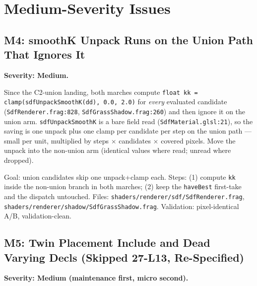 \documentclass[11pt,a4paper]{article}
\begin{document}
\section{Medium-Severity Issues}

\subsection{M4: smoothK Unpack Runs on the Union Path That Ignores It}

\textbf{Severity: Medium.}

Since the C2-union landing, both marches compute
\texttt{float kk = clamp(sdfUnpackSmoothK(dd), 0.0, 2.0)} for \emph{every}
evaluated candidate (\texttt{SdfRenderer.frag:828},
\texttt{SdfGrassShadow.frag:260}) and then ignore it on the union arm.
\texttt{sdfUnpackSmoothK} is a bare field read
(\texttt{SdfMaterial.glsl:21}), so the saving is one unpack plus one clamp
per candidate per step on the union path --- small per unit, multiplied by
steps $\times$ candidates $\times$ covered pixels. Move the unpack into the
non-union arm (identical values where read; unread where dropped).

\begin{tcolorbox}[promptbox={Prompt --- M4: unpack smoothK only off the union path}]
Goal: union candidates skip one unpack+clamp each. Steps: (1) compute
\texttt{kk} inside the non-union branch in both marches; (2) keep the
\texttt{haveBest} first-take and the dispatch untouched. Files:
\texttt{shaders/renderer/sdf/SdfRenderer.frag},
\texttt{shaders/renderer/shadow/SdfGrassShadow.frag}. Validation:
pixel-identical A/B, validation-clean.
\end{tcolorbox}

\subsection{M5: Twin Placement Include and Dead Varying Decls (Skipped 27-L13, Re-Specified)}

\textbf{Severity: Medium (maintenance first, micro second).}
\end{document}

